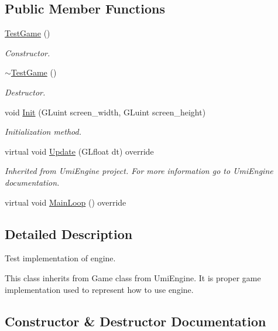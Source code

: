 \subsection*{Public Member Functions}
\begin{DoxyCompactItemize}
\item 
\mbox{\hyperlink{class_test_game_a59adf28e5c02386f31f444e1f85aa80d}{Test\+Game}} ()
\begin{DoxyCompactList}\small\item\em Constructor. \end{DoxyCompactList}\item 
\mbox{\hyperlink{class_test_game_ac0b3267478f7d6ccea98338d3f1dee1a}{$\sim$\+Test\+Game}} ()
\begin{DoxyCompactList}\small\item\em Destructor. \end{DoxyCompactList}\item 
void \mbox{\hyperlink{class_test_game_aabd73405594a1ee0f0d312fe4e1eb237}{Init}} (G\+Luint screen\+\_\+width, G\+Luint screen\+\_\+height)
\begin{DoxyCompactList}\small\item\em Initialization method. \end{DoxyCompactList}\item 
virtual void \mbox{\hyperlink{class_test_game_a3ce3b3807eab3d1753fa4662f8c79df5}{Update}} (G\+Lfloat dt) override
\begin{DoxyCompactList}\small\item\em Inherited from Umi\+Engine project. For more information go to Umi\+Engine documentation. \end{DoxyCompactList}\item 
virtual void \mbox{\hyperlink{class_test_game_a302728c6fe309b522e4f10fcb2f55baf}{Main\+Loop}} () override
\end{DoxyCompactItemize}


\subsection{Detailed Description}
Test implementation of engine. 

This class inherits from Game class from Umi\+Engine. It is proper game implementation used to represent how to use engine. 

\subsection{Constructor \& Destructor Documentation}
\mbox{\label{class_test_game_a59adf28e5c02386f31f444e1f85aa80d}} 
